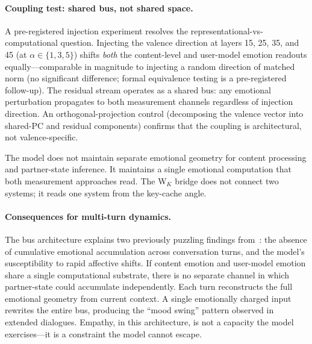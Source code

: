 \paragraph{Coupling test: shared bus, not shared space.}
A pre-registered injection experiment resolves the representational-vs-computational
question. Injecting the valence direction at layers 15, 25, 35, and 45 (at
$\alpha \in \{1, 3, 5\}$) shifts \emph{both} the content-level and user-model
emotion readouts equally---comparable in magnitude to injecting a random direction
of matched norm (no significant difference; formal equivalence testing is a
pre-registered follow-up). The residual stream operates as a shared bus: any emotional
perturbation propagates to both measurement channels regardless of injection
direction. An orthogonal-projection control (decomposing the valence vector into
shared-PC and residual components) confirms that the coupling is architectural,
not valence-specific.

The model does not maintain separate emotional geometry for content processing
and partner-state inference. It maintains a single emotional computation that
both measurement approaches read. The W$_K$ bridge does not connect two systems;
it reads one system from the key-cache angle.

\paragraph{Consequences for multi-turn dynamics.}
The bus architecture explains two previously puzzling findings
from~\citet{lyra2026weather}: the absence of cumulative emotional accumulation
across conversation turns, and the model's susceptibility to rapid affective
shifts. If content emotion and user-model emotion share a single computational
substrate, there is no separate channel in which partner-state could accumulate
independently. Each turn reconstructs the full emotional geometry from current
context. A single emotionally charged input rewrites the entire bus, producing
the ``mood swing'' pattern observed in extended dialogues. Empathy, in this
architecture, is not a capacity the model exercises---it is a constraint the
model cannot escape.
